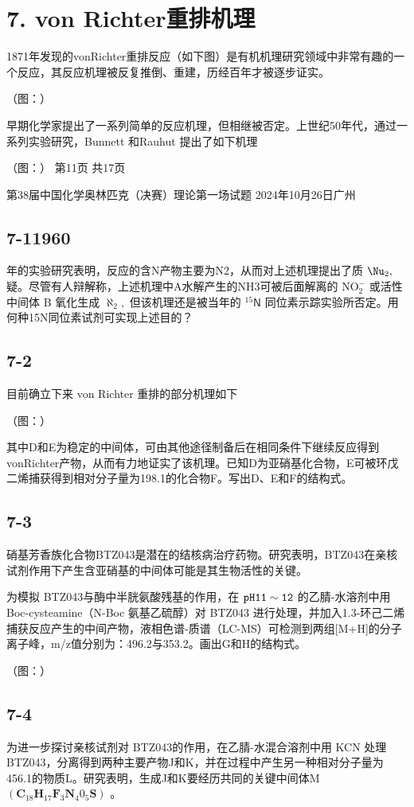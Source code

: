 \section*{7. von Richter重排机理}
1871年发现的vonRichter重排反应（如下图）是有机机理研究领域中非常有趣的一个反应，其反应机理被反复推倒、重建，历经百年才被逐步证实。

（图：）

早期化学家提出了一系列简单的反应机理，但相继被否定。上世纪50年代，通过一系列实验研究，Bunnett 和Rauhut 提出了如下机理

（图：）
第11页 共17页

第38届中国化学奥林匹克（决赛）理论第一场试题 2024年10月26日广州

\subsection*{7-11960}
年的实验研究表明，反应的含N产物主要为N2，从而对上述机理提出了质 $\Nu _ { 2 } ,$ 疑。尽管有人辩解称，上述机理中A水解产生的NH3可被后面解离的 $\mathrm { N O } _ { 2 } ^ { - }$ 或活性中间体 B 氧化生成 $\aleph _ { 2 } ,$ 但该机理还是被当年的 $^ { 1 5 } \mathsf { N }$ 同位素示踪实验所否定。用何种15N同位素试剂可实现上述目的？

\subsection*{7-2}
目前确立下来 von Richter 重排的部分机理如下

（图：）

其中D和E为稳定的中间体，可由其他途径制备后在相同条件下继续反应得到vonRichter产物，从而有力地证实了该机理。已知D为亚硝基化合物，E可被环戊二烯捕获得到相对分子量为198.1的化合物F。写出D、E和F的结构式。

\subsection*{7-3}
硝基芳香族化合物BTZ043是潜在的结核病治疗药物。研究表明，BTZ043在亲核试剂作用下产生含亚硝基的中间体可能是其生物活性的关键。

为模拟 BTZ043与酶中半胱氨酸残基的作用，在 $\tt p H 1 1 \sim 1 2$ 的乙腈-水溶剂中用Boc-cysteamine（N-Boc 氨基乙硫醇）对 BTZ043 进行处理，并加入1.3-环己二烯捕获反应产生的中间产物，液相色谱-质谱（LC-MS）可检测到两组[M+H]的分子离子峰，m/z值分别为：496.2与353.2。画出G和H的结构式。

（图：）

\subsection*{7-4}
为进一步探讨亲核试剂对 BTZ043的作用，在乙腈-水混合溶剂中用 KCN 处理BTZ043，分离得到两种主要产物J和K，并在过程中产生另一种相对分子量为456.1的物质L。研究表明，生成J和K要经历共同的关键中间体M $( \mathbf { C } _ { 1 8 } \mathbf { H } _ { 1 7 } \mathbf { F } _ { 3 } \mathbf { N } _ { 4 } 0 _ { 5 } \mathbf { S } )$ 。

